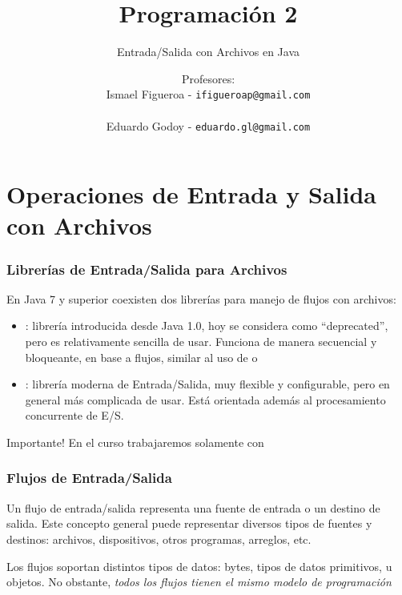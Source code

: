\documentclass{beamer}
\title[\textbf{Programación 2}]{\textbf{Programación 2}}
\subtitle{Entrada/Salida con Archivos en Java}
\author[IF-EG]
{Profesores:\\
  Ismael Figueroa -  \texttt{\small ifigueroap@gmail.com} \\
  \vspace{0.5mm} \\
  Eduardo Godoy - \texttt{\small eduardo.gl@gmail.com}
}
\institute[Universidad de Valparaíso]
\date{}
\begin{document}
\begin{frame}
  \titlepage
\end{frame}

\section{Operaciones de Entrada y Salida con Archivos}

\begin{frame}
  \frametitle{Librerías de Entrada/Salida para Archivos}

  En Java 7 y superior coexisten dos librerías para manejo de flujos
  con archivos:

  \begin{itemize}
  \item {}: librería introducida desde Java 1.0, hoy se
    considera como ``deprecated'', pero es relativamente sencilla de
    usar. Funciona de manera secuencial y bloqueante, en base a
    flujos, similar al uso de  o 

  \item {}: librería moderna de Entrada/Salida, muy
    flexible y configurable, pero en general más complicada de
    usar. Está orientada además al procesamiento concurrente de E/S.

  \end{itemize}

  \begin{alertblock}{Importante!}
      En el curso trabajaremos solamente con 
  \end{alertblock}

\end{frame}

\begin{frame}
  \frametitle{Flujos de Entrada/Salida}

  \begin{block}{}
    Un flujo de entrada/salida representa una fuente de entrada o un
    destino de salida. Este concepto general puede representar
    diversos tipos de fuentes y destinos: archivos, dispositivos,
    otros programas, arreglos, etc.
  \end{block}

  \begin{block}{}
    Los flujos soportan distintos tipos de datos: bytes, tipos de
    datos primitivos, u objetos. No obstante, \emph{todos los flujos
      tienen el mismo modelo de programación}
  \end{block}
\end{frame}
\end{document}
